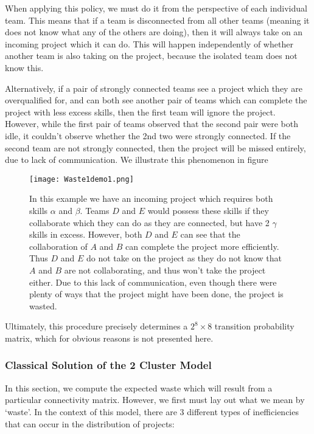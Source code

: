 When applying this policy, we must do it from the perspective of each individual team. This means that if a team is disconnected from all other teams (meaning it does not know what any of the others are doing), then it will always take on an incoming project which it can do. This will happen independently of whether another team is also taking on the project, because the isolated team does not know this. 

Alternatively, if a pair of strongly connected teams see a project which they are overqualified for, and can both see another pair of teams which can complete the project with less excess skills, then the first team will ignore the project. However, while the first pair of teams observed that the second pair were both idle, it couldn't observe whether the 2nd two were strongly connected. If the second team are not strongly connected, then the project will be missed entirely, due to lack of communication. We illustrate this phenomenon in figure 

\begin{figure}[ht]
	\centering	
	\texttt{[image: Waste1demo1.png]}
	\caption{In this example we have an incoming project which requires both skills $\alpha$ and $\beta$. Teams $D$ and $E$ would possess these skills if they collaborate which they can do as they are connected, but have 2 $\gamma$ skills in excess. However, both $D$ and $E$ can see that the collaboration of $A$ and $B$ can complete the project more efficiently. Thus $D$ and $E$ do not take on the project as they do not know that $A$ and $B$ are not collaborating, and thus won't take the project either. Due to this lack of communication, even though there were plenty of ways that the project might have been done, the project is wasted.}
	\label{fig:waste1demo1}
\end{figure}

Ultimately, this procedure precisely determines a $2^8 \times 8$ transition probability matrix, which for obvious reasons is not presented here.

\subsubsection{Classical Solution of the 2 Cluster Model}

In this section, we compute the expected waste which will result from a particular connectivity matrix. However, we first must lay out what we mean by `waste'. In the context of this model, there are 3 different types of inefficiencies that can occur in the distribution of projects:

